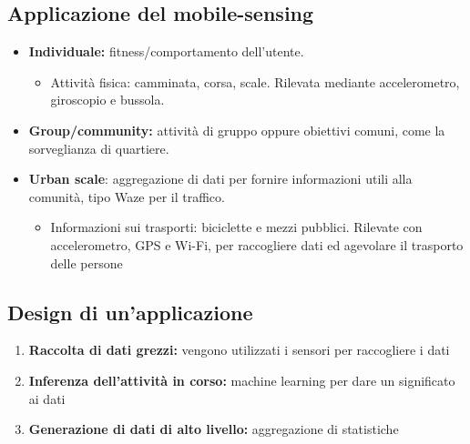 \subsection{Applicazione del mobile-sensing}
\label{applicazione-del-mobile-sensing}

\begin{itemize}
\item \textbf{Individuale:} fitness/comportamento dell'utente.


  \begin{itemize}
  \item Attività fisica: camminata, corsa, scale. Rilevata mediante
    accelerometro, giroscopio e bussola.

  \end{itemize}
\item \textbf{Group/community:} attività di gruppo oppure obiettivi comuni,
  come la sorveglianza di quartiere.

\item \textbf{Urban scale}: aggregazione di dati per fornire informazioni
  utili alla comunità, tipo Waze per il traffico.


  \begin{itemize}
  \item Informazioni sui trasporti: biciclette e mezzi pubblici. Rilevate
    con accelerometro, GPS e Wi-Fi, per raccogliere dati ed agevolare il
    trasporto delle persone

  \end{itemize}
\end{itemize}

\subsection{Design di un'applicazione}
\label{design-di-unapplicazione}

\begin{enumerate}
\def\labelenumi{\arabic{enumi}.}
\item \textbf{Raccolta di dati grezzi:} vengono utilizzati i sensori per
  raccogliere i dati

\item \textbf{Inferenza dell'attività in corso:} machine learning per dare
  un significato ai dati

\item \textbf{Generazione di dati di alto livello:} aggregazione di
  statistiche

\end{enumerate}

